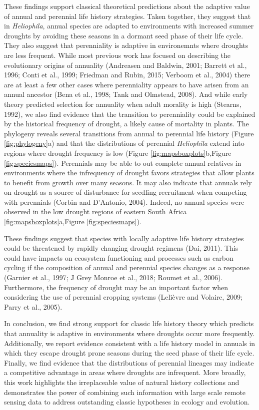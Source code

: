 \documentclass[man,floatsintext]{apa6}
\theoremstyle{definition}
\theoremstyle{definition}
\theoremstyle{definition}
\theoremstyle{remark}
\begin{document}
These findings support classical theoretical predictions about the
adaptive value of annual and perennial life history strategies. Taken
together, they suggest that in \emph{Heliophila}, annual species are
adapted to environments with increased summer droughts by avoiding these
seasons in a dormant seed phase of their life cycle. They also suggest
that perenniality is adaptive in environemnts where droughts are less
frequent. While most previous work has focused on describing the
evolutionary origins of annuality (Andreasen and Baldwin, 2001; Barrett
et al., 1996; Conti et al., 1999; Friedman and Rubin, 2015; Verboom et
al., 2004) there are at least a few other cases where perenniality
appears to have arisen from an annual ancestor (Bena et al., 1998; Tank
and Olmstead, 2008). And while early theory predicted selection for
annuality when adult morality is high (Stearns, 1992), we also find
evidence that the transition to perenniality could be explained by the
historical frequency of drought, a likely cause of mortality in plants.
The phylogeny reveals several transitions from annual to perennial life
history (Figure \ref{fig:phylogeny}a) and that the distributions of
perennial \emph{Heliophila} extend into regions where drought frequency
is low (Figure \ref{fig:mapsboxplots}b,Figure \ref{fig:speciesmaps}).
Perennials may be able to out complete annual relatives in environments
where the infrequency of drought favors strategies that allow plants to
benefit from growth over many seasons. It may also indicate that annuals
rely on drought as a source of disturbance for seedling recruitment when
competing with perennials (Corbin and D'Antonio, 2004). Indeed, no
annual species were observed in the low drought regions of eastern South
Africa \ref{fig:mapsboxplots}a,Figure \ref{fig:speciesmaps}).

These findings suggest that species with locally adaptive life history
strategies could be threatened by rapidly changing drought regimens
(Dai, 2011). This could have impacts on ecosystem functioning and
processes such as carbon cycling if the composition of annual and
perennial species changes as a response (Garnier et al., 1997; J Grey
Monroe et al., 2018; Roumet et al., 2006). Furthermore, the frequency of
drought may be an important factor when considering the use of perennial
cropping systems (Lelièvre and Volaire, 2009; Parry et al., 2005).

In conclusion, we find strong support for classic life history theory
which predicts that annuality is adaptive in environments where droughts
occur more frequently. Additionally, we report evidence consistent with
a life history model in annuals in which they escape drought prone
seasons during the seed phase of their life cycle. Finally, we find
evidence that the distributions of perennial lineages may indicate a
competitive advantage in areas where droughts are infrequent. More
broadly, this work highlights the irreplaceable value of natural history
collections and demonstrates the power of combining such information
with large scale remote sensing data to address outstanding classic
hypotheses in ecology and evolution.
\end{document}
